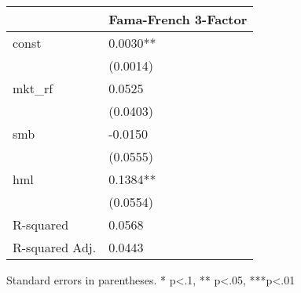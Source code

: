 \begin{table}
\caption{}
\label{}
\begin{center}
\begin{tabular}{ll}
\hline
               & Fama-French 3-Factor  \\
\hline
const          & 0.0030**              \\
               & (0.0014)              \\
mkt\_rf        & 0.0525                \\
               & (0.0403)              \\
smb            & -0.0150               \\
               & (0.0555)              \\
hml            & 0.1384**              \\
               & (0.0554)              \\
R-squared      & 0.0568                \\
R-squared Adj. & 0.0443                \\
\hline
\end{tabular}
\end{center}
\end{table}
\bigskip
Standard errors in parentheses. \newline 
* p<.1, ** p<.05, ***p<.01